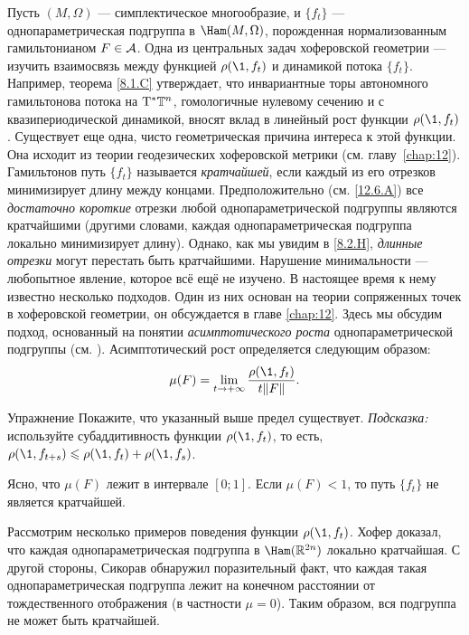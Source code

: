 Пусть $(M, \Omega)$ — симплектическое многообразие, и $\{f_t\}$ —
однопараметрическая подгруппа в $\Ham (M, \Omega)$, порожденная
нормализованным гамильтонианом $F \in \mathcal{A}$. 
Одна из центральных задач хоферовской геометрии — изучить
взаимосвязь между функцией $\rho (\1, f_t)$ и динамикой потока
$\{f_t\}$.
Например, теорема \ref{8.1.C} утверждает, что инвариантные торы
автономного гамильтонова потока на $\mathrm{T}^\ast \mathbb{T}^n$,  гомологичные
нулевому сечению и с квазипериодической динамикой, вносят вклад в
линейный рост функции $\rho (\1, f_t)$. 
Существует еще одна, чисто геометрическая причина интереса к этой функции.
Она исходит из теории геодезических хоферовской метрики (см. главу~\ref{chap:12}). 
Гамильтонов путь $\{f_t\}$ называется
\emph{кратчайшей}, если каждый из его отрезков
минимизирует длину между  концами.\?{}{} 
Предположительно (см. \ref{12.6.A}) все {}\emph{достаточно короткие}
отрезки любой однопараметрической подгруппы являются кратчайшими
(другими словами, каждая однопараметрическая подгруппа локально
минимизирует длину). 
Однако, как мы увидим в \ref{8.2.H}, {}\emph{длинные отрезки} могут перестать
быть кратчайшими. 
Нарушение минимальности — любопытное явление, которое всё ещё не изучено.
В настоящее время к нему известно несколько подходов.
Один из них основан на теории сопряженных точек в хоферовской
геометрии, он обсуждается в главе \ref{chap:12}. 
Здесь мы обсудим подход, основанный на понятии \emph{асимптотического роста}
однопараметрической подгруппы (см. \cite{BP2}). 
Асимптотический рост определяется следующим образом: 
\[\mu(F)=\lim_{t \to + \infty}\frac{\rho (\1, f_t)}{ t \| F \|}.\]

\begin{ex*}{Упражнение}
Покажите, что указанный выше предел существует.
\emph{Подсказка:} используйте субаддитивность функции $\rho (\1, f_t)$, то есть, $\rho (\1, f_{t + s}) \le \rho (\1, f_t) + \rho (\1, f_s)$. 
\end{ex*}

Ясно, что $\mu (F)$ лежит в интервале $[0; 1]$.
Если $\mu (F) <1$, то путь $\{f_t\}$ не является кратчайшей.

Рассмотрим несколько примеров поведения функции $\rho (\1, f_t)$.
Хофер \cite{H2} доказал, что каждая однопараметрическая подгруппа в
$\Ham (\RR^{2n})$ локально кратчайшая. 
С другой стороны, Сикорав \cite{S2} обнаружил поразительный
факт, что каждая такая однопараметрическая подгруппа лежит на конечном расстоянии от тождественного отображения (в частности $\mu=0$).
Таким образом, вся подгруппа не может быть кратчайшей. 

